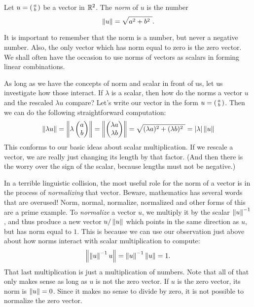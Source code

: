 \documentclass[00-livre-main.tex]{subfiles}
\begin{document}
\begin{definition}
Let $u = \left(\begin{smallmatrix} a \\ b \end{smallmatrix}\right)$ be a vector in $\mathbb{R}^2$.
The \emph{norm} of $u$ is the number
\[
\norm{u} = \sqrt{a^2 + b^2\ }.
\]
\end{definition}

It is important to remember that the norm is a number, but never a negative number. Also, the only vector which has norm equal to zero is the zero vector. We shall often have the occasion to use norms of vectors as scalars in forming linear combinations.

As long as we have the concepts of norm and scalar in front of us, let us investigate how those interact. If $\lambda$ is a scalar, then how do the norms a vector $u$ and the rescaled $\lambda u$ compare? Let's write our vector in the form $u=\left(\begin{smallmatrix} a \\ b \end{smallmatrix}\right)$. Then we can do the following straightforward computation:
\[
\left\|\lambda u\right\| = \left\| \lambda \begin{pmatrix} a \\ b \end{pmatrix}\right\| = \left\| \begin{pmatrix} \lambda a \\ \lambda b \end{pmatrix} \right\| = \sqrt{ (\lambda a)^2 + (\lambda b)^2\ } = |\lambda| \left\|u\right\|
\]
This conforms to our basic ideas about scalar multiplication. If we rescale a vector, we are really just changing its length by that factor. (And then there is the worry over the sign of the scalar, because lengths must not be negative.)


In a terrible linguistic collision, the most useful role for the norm of a vector is in the process of \emph{normalizing} that vector. 
Beware, mathematics has several words that are overused! 
Norm, normal, normalize, normalized and other forms of this are a prime example.
To \emph{normalize} a vector $u$, we multiply it by the scalar $\left\|u\right\|^{-1}$, and thus produce a new vector $u/\left\|u\right\|$ which points in the same direction as $u$, but has norm equal to $1$. This is because we can use our observation just above about how norms interact with scalar multiplication to compute:
\[
\left\|\left\|u\right\|^{-1} u\right\| = \left\|u\right\|^{-1}\left\|u\right\|  = 1.
\]
That last multiplication is just a multiplication of numbers.
Note that all of that only makes sense as long as $u$ is not the zero vector. If $u$ is the zero vector, its norm is $\left\|u\right\|=0$. Since it makes no sense to divide by zero, it is not possible to normalize the zero vector.
\end{document}
